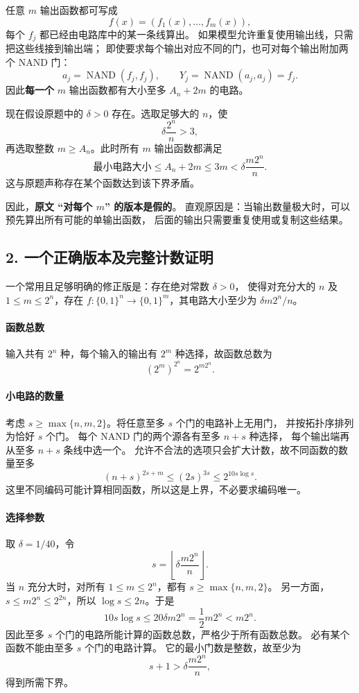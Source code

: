 \documentclass[UTF8,fontset=fandol,11pt,a4paper]{ctexart}
\newcommand{\bits}{\{0,1\}}
\newcommand{\NAND}{\operatorname{NAND}}
\begin{document}
任意 $m$ 输出函数都可写成
\[
 f(x)=(f_1(x),\ldots,f_m(x)),
\]
每个 $f_j$ 都已经由电路库中的某一条线算出。
如果模型允许重复使用输出线，只需把这些线接到输出端；
即使要求每个输出对应不同的门，也可对每个输出附加两个 NAND 门：
\[
 a_j=\NAND(f_j,f_j),\qquad Y_j=\NAND(a_j,a_j)=f_j.
\]
因此\textbf{每一个} $m$ 输出函数都有大小至多 $A_n+2m$ 的电路。

现在假设原题中的 $\delta>0$ 存在。选取足够大的 $n$，使
\[
 \delta\frac{2^n}{n}>3,
\]
再选取整数 $m\ge A_n$。此时所有 $m$ 输出函数都满足
\[
 \text{最小电路大小}\le A_n+2m\le3m
 <\delta\frac{m2^n}{n}.
\]
这与原题声称存在某个函数达到该下界矛盾。

因此，\textbf{原文 ``对每个 $m$'' 的版本是假的}。
直观原因是：当输出数量极大时，可以预先算出所有可能的单输出函数，
后面的输出只需要重复使用或复制这些结果。

\subsection*{2. 一个正确版本及完整计数证明}
一个常用且足够明确的修正版是：存在绝对常数 $\delta>0$，
使得对充分大的 $n$ 及 $1\le m\le2^n$，存在 $f:\bits^n\to\bits^m$，其电路大小至少为
$\delta m2^n/n$。

\paragraph{函数总数}
输入共有 $2^n$ 种，每个输入的输出有 $2^m$ 种选择，故函数总数为
\[
 (2^m)^{2^n}=2^{m2^n}.
\]

\paragraph{小电路的数量}
考虑 $s\ge\max\{n,m,2\}$。将任意至多 $s$ 个门的电路补上无用门，
并按拓扑序排列为恰好 $s$ 个门。
每个 NAND 门的两个源各有至多 $n+s$ 种选择，
每个输出端再从至多 $n+s$ 条线中选一个。
允许不合法的选项只会扩大计数，故不同函数的数量至多
\[
 (n+s)^{2s+m}\le(2s)^{3s}
 \le 2^{10s\log s}.
\]
这里不同编码可能计算相同函数，所以这是上界，不必要求编码唯一。

\paragraph{选择参数}
取 $\delta=1/40$，令
\[
 s=\left\lfloor\delta\frac{m2^n}{n}\right\rfloor.
\]
当 $n$ 充分大时，对所有 $1\le m\le2^n$，都有 $s\ge\max\{n,m,2\}$。
另一方面，$s\le m2^n\le2^{2n}$，所以 $\log s\le2n$。于是
\[
 10s\log s
 \le20\delta m2^n
 =\frac12m2^n
 <m2^n.
\]
因此至多 $s$ 个门的电路所能计算的函数总数，严格少于所有函数总数。
必有某个函数不能由至多 $s$ 个门的电路计算。
它的最小门数是整数，故至少为
\[
 s+1>\delta\frac{m2^n}{n},
\]
得到所需下界。
\end{document}
